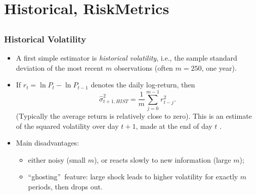 \section{Historical, RiskMetrics}\subsection*{}

\begin{frame}%

\frametitle{Historical Volatility}

\begin{itemize}
\item A first simple estimator is \emph{\color{red}historical volatility},
i.e., the sample standard deviation of the most recent $m$ observations
(often $m=250$, one year).

\item If $r_{t}=\ln P_t-\ln P_{t-1}$ denotes the daily log-return, then
\begin{equation*}
\widehat{\sigma}_{t+1,HIST}^{2}=\frac{1}{m}\sum_{j=0}^{m-1}r_{t-j}^{2}.
\end{equation*}
(Typically the average return is relatively close to zero). This is an
estimate of the squared volatility over day $t+1$, made at the end of day $t$%
.

\item Main disadvantages:

\begin{itemize}
\item either noisy (small $m$), or reacts slowly to new information (large $%
m $);

\item \textquotedblleft ghosting\textquotedblright\ feature: large shock
leads to higher volatility for exactly $m$ periods, then drops out.
\end{itemize}
\end{itemize}

\end{frame}%

